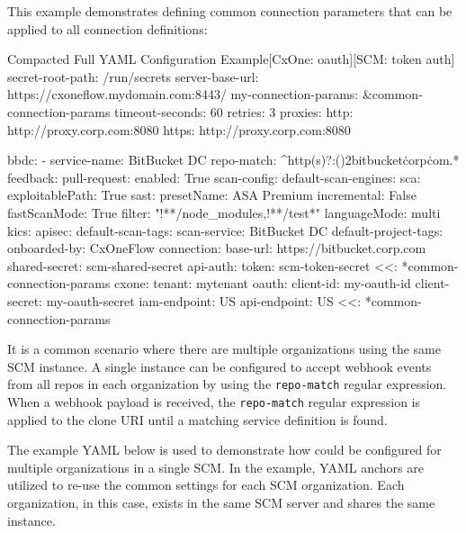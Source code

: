 This example demonstrates defining common connection parameters that can be applied
to all connection definitions:

\begin{code}{Compacted Full YAML Configuration Example}{[CxOne: oauth]}{[SCM: token auth]}
secret-root-path: /run/secrets
server-base-url: https://cxoneflow.mydomain.com:8443/
my-connection-params: &common-connection-params
    timeout-seconds: 60
    retries: 3
    proxies:
        http: http://proxy.corp.com:8080
        https: http://proxy.corp.com:8080


bbdc:
    - service-name: BitBucket DC
      repo-match: ^http(s)?:(\/){2}bitbucket\.corp\.com.*
      feedback:
        pull-request:
            enabled: True
      scan-config:
          default-scan-engines:
              sca:
                  exploitablePath: True
              sast:
                  presetName: ASA Premium
                  incremental: False
                  fastScanMode: True
                  filter: "!**/node_modules,!**/test*"
                  languageMode: multi
              kics:
              apisec:
          default-scan-tags:
              scan-service: BitBucket DC
          default-project-tags:
              onboarded-by: CxOneFlow
      connection:
          base-url: https://bitbucket.corp.com
          shared-secret: scm-shared-secret
          api-auth:
              token: scm-token-secret
          <<: *common-connection-params
      cxone:
          tenant: mytenant
          oauth:
              client-id: my-oauth-id
              client-secret: my-oauth-secret
          iam-endpoint: US
          api-endpoint: US
          <<: *common-connection-params
\end{code}

It is a common scenario where there are multiple organizations
using the same SCM instance.  A single \cxoneflow instance can be configured to accept
webhook events from all repos in each organization by using the \texttt{repo-match}
regular expression.  When a webhook payload is received, the \texttt{repo-match}
regular expression is applied to the clone URI until a matching service definition is found.

The example YAML below is used to demonstrate how \cxoneflow could be configured
for multiple organizations in a single SCM. In the example, YAML anchors are utilized to 
re-use the common settings for each SCM organization.  Each organization, in this case, 
exists in the same SCM server and shares the same \cxone instance.

